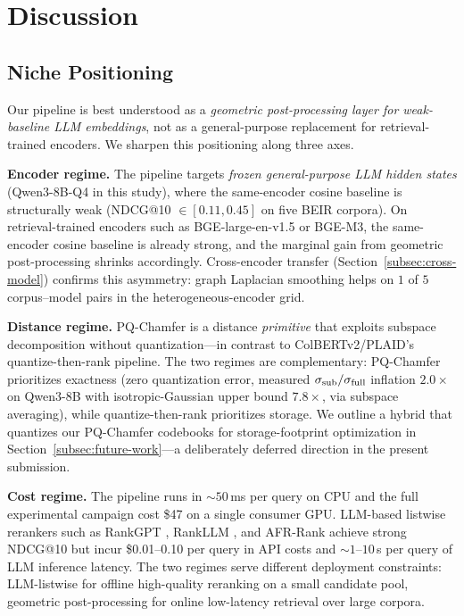 \documentclass[review,1p]{elsarticle}
\begin{document}
\section{Discussion}
\label{sec:discussion}

\subsection{Niche Positioning}
\label{subsec:niche}

Our pipeline is best understood as a \emph{geometric post-processing layer for weak-baseline LLM embeddings}, not as a general-purpose replacement for retrieval-trained encoders. We sharpen this positioning along three axes.

\textbf{Encoder regime.} The pipeline targets \emph{frozen general-purpose LLM hidden states} (Qwen3-8B-Q4 in this study), where the same-encoder cosine baseline is structurally weak (NDCG@10 $\in [0.11, 0.45]$ on five BEIR corpora). On retrieval-trained encoders such as BGE-large-en-v1.5 or BGE-M3, the same-encoder cosine baseline is already strong, and the marginal gain from geometric post-processing shrinks accordingly. Cross-encoder transfer (Section~\ref{subsec:cross-model}) confirms this asymmetry: graph Laplacian smoothing helps on $1$ of $5$ corpus--model pairs in the heterogeneous-encoder grid.

\textbf{Distance regime.} PQ-Chamfer is a distance \emph{primitive} that exploits subspace decomposition without quantization---in contrast to ColBERTv2/PLAID's quantize-then-rank pipeline. The two regimes are complementary: PQ-Chamfer prioritizes exactness (zero quantization error, measured $\sigma_{\rm sub}/\sigma_{\rm full}$ inflation $2.0\times$ on Qwen3-8B with isotropic-Gaussian upper bound $7.8\times$, via subspace averaging), while quantize-then-rank prioritizes storage. We outline a hybrid that quantizes our PQ-Chamfer codebooks for storage-footprint optimization in Section~\ref{subsec:future-work}---a deliberately deferred direction in the present submission.

\textbf{Cost regime.} The pipeline runs in ${\sim}50$\,ms per query on CPU and the full experimental campaign cost \$47 on a single consumer GPU. LLM-based listwise rerankers such as RankGPT \citep{sun2024rankgpt}, RankLLM \citep{pradeep2025rankllm}, and AFR-Rank \citep{afrrank2025} achieve strong NDCG@10 but incur \$0.01--0.10 per query in API costs and ${\sim}1$--$10$\,s per query of LLM inference latency. The two regimes serve different deployment constraints: LLM-listwise for offline high-quality reranking on a small candidate pool, geometric post-processing for online low-latency retrieval over large corpora.
\end{document}
